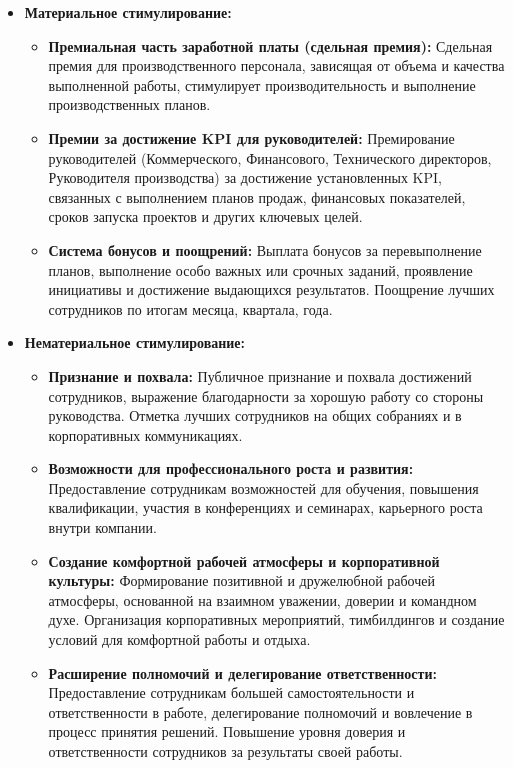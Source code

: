 \begin{itemize}
    \item \textbf{Материальное стимулирование:}
        \begin{itemize}
            \item \textbf{Премиальная часть заработной платы (сдельная премия):}  Сдельная премия для производственного персонала, зависящая от объема и качества выполненной работы, стимулирует производительность и выполнение производственных планов.
            \item \textbf{Премии за достижение KPI для руководителей:}  Премирование руководителей (Коммерческого, Финансового, Технического директоров, Руководителя производства) за достижение установленных KPI, связанных с выполнением планов продаж, финансовых показателей, сроков запуска проектов и других ключевых целей.
            \item \textbf{Система бонусов и поощрений:}  Выплата бонусов за перевыполнение планов, выполнение особо важных или срочных заданий, проявление инициативы и достижение выдающихся результатов.  Поощрение лучших сотрудников по итогам месяца, квартала, года.
        \end{itemize}
    \item \textbf{Нематериальное стимулирование:}
        \begin{itemize}
            \item \textbf{Признание и похвала:}  Публичное признание и похвала достижений сотрудников, выражение благодарности за хорошую работу со стороны руководства.  Отметка лучших сотрудников на общих собраниях и в корпоративных коммуникациях.
            \item \textbf{Возможности для профессионального роста и развития:}  Предоставление сотрудникам возможностей для обучения, повышения квалификации, участия в конференциях и семинарах, карьерного роста внутри компании.
            \item \textbf{Создание комфортной рабочей атмосферы и корпоративной культуры:}  Формирование позитивной и дружелюбной рабочей атмосферы, основанной на взаимном уважении, доверии и командном духе.  Организация корпоративных мероприятий, тимбилдингов и создание условий для комфортной работы и отдыха.
            \item \textbf{Расширение полномочий и делегирование ответственности:}  Предоставление сотрудникам большей самостоятельности и ответственности в работе, делегирование полномочий и вовлечение в процесс принятия решений.  Повышение уровня доверия и ответственности сотрудников за результаты своей работы.
        \end{itemize}
\end{itemize}